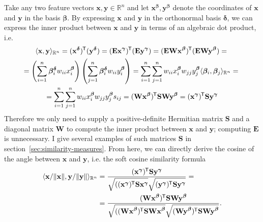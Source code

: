 \documentclass[
  digital, %
  notable, %
  lof,     %
  lot,     %
  nopalatino, color
]{fithesis3}
\newcommand*{\tran}{^{\mkern-1.5mu\mathsf{T}}}
\begin{document}
Take any two feature vectors $\mathbf x, \mathbf y\in\mathbb R^n$ and let
$\mathbf x^{\bm{\beta}}, \mathbf y^{\bm{\beta}}$ denote the coordinates of
$\mathbf x$ and $\mathbf y$ in the basis $\bm\beta$.
By expressing $\mathbf x$ and $\mathbf y$ in the orthonormal basis
$\bm\delta$, we can express the inner product between
$\mathbf x$ and $\mathbf y$ in terms of an algebraic dot product,
i.e.\begin{multline}
  \label{eq:similarity-inner-product}
  \langle\mathbf x, \mathbf y\rangle_{\mathbb R^n}
  = (\mathbf{x}^{\bm\delta})\tran (\mathbf{y}^{\bm\delta})
  = (\mathbf{Ex}^{\bm\gamma})\tran (\mathbf{Ey}^{\bm\gamma})
  = (\mathbf{EWx}^{\bm\beta})\tran (\mathbf{EWy}^{\bm\beta}) ={} \\
  = \left(\sum_{i=1}^n \bm{\beta}_i^{\bm\delta}w_{ii}x_i^{\bm\beta}\right)\left(\sum_{j=1}^n\bm{\beta}_i^{\bm\delta}w_{ii} y_i^{\bm\beta}\right)
  = \sum_{i=1}^n\sum_{j=1}^nw_{ii}x_i^{\bm\beta}w_{jj}y_j^{\bm\beta} \langle\bm\beta_i, \bm\beta_j\rangle_{\mathbb R^n} ={} \\
  = \sum_{i=1}^n\sum_{j=1}^nw_{ii}x_i^{\bm\beta}w_{jj}y_j^{\bm\beta} s_{ij}
  = (\mathbf{Wx}^{\bm\beta})\tran \mathbf S\mathbf{Wy}^{\bm\beta}
  = (\mathbf{x}^{\bm\gamma})\tran \mathbf S\mathbf{y}^{\bm\gamma}
\end{multline}
Therefore we only need to supply a positive-definite Hermitian matrix $\mathbf{S}$ and a diagonal matrix $\mathbf W$ to compute the inner
product between $\mathbf x$ and $\mathbf y$; computing $\mathbf E$
 is unnecessary. I give several examples of such matrices
$\mathbf S$ in section~\ref{sec:similarity-measures}. From here, we can
directly derive the cosine of the angle between $\mathbf x$ and $\mathbf y$,
i.e. the soft cosine similarity formula
\begin{equation}
\label{eq:similarity-soft-cosine}
\begin{aligned}
  \langle\mathbf x/\Vert\mathbf x\Vert, \mathbf y/\Vert\mathbf y\Vert\rangle_{\mathbb R^n} &= 
  \frac{(\mathbf x^{\bm\gamma})\tran\mathbf S\mathbf y^{\bm\gamma}}{\sqrt{\strut((\mathbf x^{\bm\gamma})\tran\mathbf S\mathbf x^{\bm\gamma}}\sqrt{\strut(\mathbf y^{\bm\gamma})\tran\mathbf S\mathbf y^{\bm\gamma}}} = \\
  &= \frac{(\mathbf{Wx}^{\bm\beta})\tran\mathbf S\mathbf{Wy}^{\bm\beta}}{\sqrt{\strut((\mathbf{Wx}^{\bm\beta})\tran\mathbf S\mathbf{Wx}^{\bm\beta}}\sqrt{\strut(\mathbf{Wy}^{\bm\beta})\tran\mathbf S\mathbf{Wy}^{\bm\beta}}}.
\end{aligned}
\end{equation}
\end{document}
